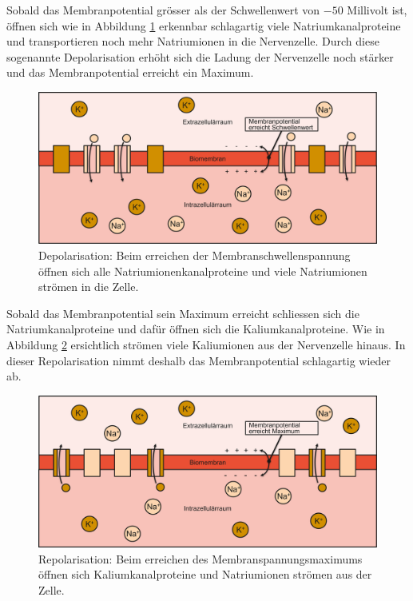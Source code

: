 \begin{refsection}
Sobald das Membranpotential grösser als der Schwellenwert von $-50$ Millivolt ist, öffnen sich wie in Abbildung
\ref{fig:Depolarisation} erkennbar schlagartig viele
Natriumkanalproteine und transportieren noch mehr Natriumionen in die Nervenzelle.
Durch diese sogenannte Depolarisation erhöht sich die Ladung der Nervenzelle noch stärker und das Membranpotential erreicht ein Maximum. 
\begin{figure}[h]
    \centering
    \includegraphics[width=\textwidth]{papers/nerven/Bilder/Vorgang3.png}
    \caption{Depolarisation: Beim erreichen der Membranschwellenspannung öffnen sich alle Natriumionenkanalproteine und viele Natriumionen strömen in die Zelle.}
    \label{fig:Depolarisation}
\end{figure}

Sobald das Membranpotential sein Maximum erreicht schliessen sich die Natriumkanalproteine und dafür öffnen sich die
Kaliumkanalproteine.
Wie in Abbildung \ref{fig:Repolarisation} ersichtlich strömen viele Kaliumionen aus der Nervenzelle hinaus.
In dieser Repolarisation nimmt deshalb das Membranpotential schlagartig wieder ab.
\begin{figure}[h]
    \centering
    \includegraphics[width=\textwidth]{papers/nerven/Bilder/Vorgang4.png}
    \caption{Repolarisation: Beim erreichen des Membranspannungsmaximums öffnen sich Kaliumkanalproteine und Natriumionen strömen aus der Zelle.}
    \label{fig:Repolarisation}
\end{figure}


\end{refsection}
